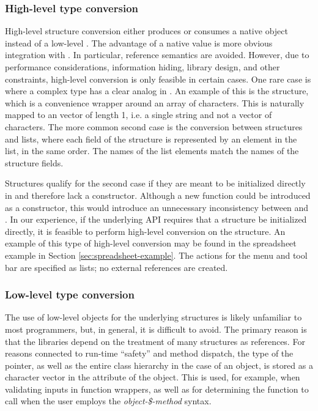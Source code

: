 \documentclass[article,shortnames]{jss}
\begin{document}
\subsubsection{High-level type
conversion}\label{sec:high-level-conversion}

High-level structure conversion either produces or consumes a native
 object instead of a low-level . The
advantage of a native  value is more obvious integration
with
. In particular, reference semantics are avoided.
However, due to performance considerations, information hiding,
library design, and other constraints, high-level conversion is only
feasible in certain cases.  One rare case is where a complex
 type has a clear analog in .  An example of
this is the  structure, which is a convenience wrapper
around an array of characters. This is naturally mapped to an
  vector of length 1, i.e. a single string
and
not a vector of characters. The more common second case is
the conversion between  structures and  lists,
where each field of the structure is represented by an element in the
list, in the same order. The names of the list elements match the
names of the structure fields.

Structures qualify for the second case if they are meant to be
initialized directly in  and therefore lack a constructor.
Although a new function could be introduced as a constructor, this
would introduce an unnecessary inconsistency between  and
.
In our experience, if the underlying API requires that a structure be
initialized directly, it is feasible to perform high-level conversion
on the structure. An example of this type of high-level conversion may
be found in the spreadsheet example in Section
\ref{sec:spreadsheet-example}. The actions for the menu and tool bar
are specified as lists; no external references are created.

\subsubsection{Low-level type conversion}

The use of low-level  objects for the underlying
 structures is likely unfamiliar to most 
programmers, but, in general, it is difficult to avoid. The primary
reason is that the  libraries depend on the treatment of
many structures as references. For reasons connected to run-time
``safety'' and method dispatch, the type of the pointer, as well as
the entire class hierarchy in the case of an object, is stored as a
character vector in the  attribute of the 
object. 
This is used, for example, when validating inputs in
function wrappers, as well as for determining the function to call
when the user employs the \emph{object-\$-method} syntax.
\end{document}
